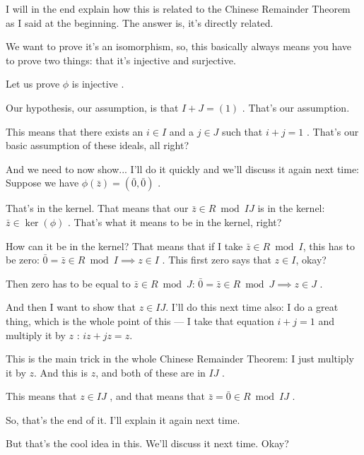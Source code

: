 \begin{speech}[01:27:55 - 01:29:47]
I will in the end explain how this is related to the Chinese Remainder Theorem as I said at the beginning. The answer is, it's directly related.

We want to prove it's an isomorphism, so, this basically always means you have to prove two things: that it's injective and surjective.

Let us prove $\phi$ is injective .

Our hypothesis, our assumption, is that $I + J = (1)$ . That's our assumption.

This means that there exists an $i \in I$ and a $j \in J$ such that $i + j = 1$ . That's our basic assumption of these ideals, all right?

And we need to now show... I'll do it quickly and we'll discuss it again next time: Suppose we have $\phi(\bar{z}) = (\bar{0}, \bar{0})$ .

That's in the kernel. That means that our $\bar{z} \in R \bmod IJ$ is in the kernel: $\bar{z} \in \ker(\phi)$ . That's what it means to be in the kernel, right?
\end{speech}

\begin{speech}[01:29:47 - 01:31:12]
How can it be in the kernel? That means that if I take $\bar{z} \in R \bmod I$, this has to be zero: $\bar{0} = \bar{z} \in R \bmod I \implies z \in I$ . This first zero says that $z \in I$, okay?

Then zero has to be equal to $\bar{z} \in R \bmod J$: $\bar{0} = \bar{z} \in R \bmod J \implies z \in J$ .

And then I want to show that $z \in IJ$. I'll do this next time also: I do a great thing, which is the whole point of this --- I take that equation $i + j = 1$ and multiply it by $z$ : $iz + jz = z$.

This is the main trick in the whole Chinese Remainder Theorem: I just multiply it by $z$. And this is $z$, and both of these are in $IJ$ .

This means that $z \in IJ$ , and that means that $\bar{z} = \bar{0} \in R \bmod IJ$ .

So, that's the end of it. I'll explain it again next time.

But that's the cool idea in this. We'll discuss it next time. Okay? 
\end{speech}

